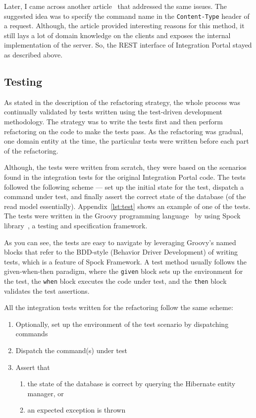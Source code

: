 \documentclass{book}
\begin{document}
Later, I came across another article~\cite{cqrs-rest} that addressed the
same issues. The suggested idea was to specify the command name in the
\texttt{Content-Type} header of a request. Although, the article
provided interesting reasons for this method, it still lays a lot of domain
knowledge on the clients and exposes the internal implementation of the
server. So, the REST interface of Integration Portal stayed as
described above.

\subsection{Testing}\label{testing}

As stated in the description of the refactoring strategy, the whole
process was continually validated by tests written using the test-driven
development methodology. The strategy was to write the tests first and
then perform refactoring on the code to make the tests pass. As the
refactoring was gradual, one domain entity at the time, the particular
tests were written before each part of the refactoring.

Although, the tests were written from scratch, they were based on the
scenarios found in the integration tests for the original Integration
Portal code. The tests followed the following scheme --- set up the
initial state for the test, dispatch a command under test, and finally
assert the correct state of the database (of the
read model essentially). Appendix~\ref{lst:test} shows an
example of one of the tests. The tests were written in the Groovy
programming language~\cite{groovy} by using Spock library~\cite{spock},
a testing and specification framework.

As you can see, the tests are easy to navigate by leveraging Groovy's
named blocks that refer to the BDD-style (Behavior Driver Development)
of writing tests, which is a feature of Spock Framework. A test method
usually follows the given-when-then paradigm, where the \texttt{given}
block sets up the environment for the test, the \texttt{when} block
executes the code under test, and the \texttt{then} block validates the
test assertions.

All the integration tests written for the refactoring follow the same
scheme:

\begin{enumerate}
\def\labelenumi{\arabic{enumi}.}
\tightlist
\item
  Optionally, set up the environment of the test scenario by dispatching
  commands
\item
  Dispatch the command(s) under test
\item
  Assert that

  \begin{enumerate}
  \def\labelenumii{\alph{enumii})}
  \tightlist
  \item
    the state of the database is correct by querying the Hibernate
    entity manager, or
  \item
    an expected exception is thrown
  \end{enumerate}
\end{enumerate}
\end{document}
